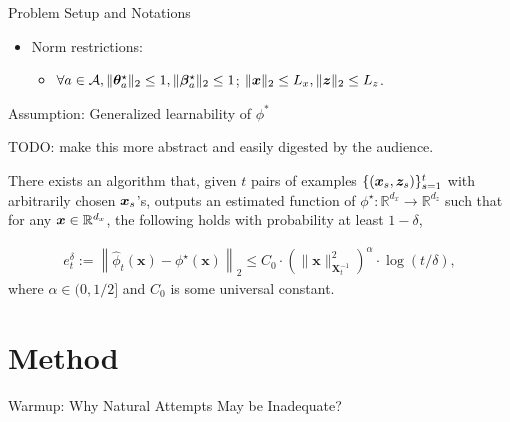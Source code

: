 \documentclass[10pt, xcolor=x11names,compress]{beamer}
\begin{document}
\begin{frame}[label=Background]{Problem Setup and Notations}
\begin{itemize}
\begin{itemize}
        \item Norm restrictions: 
        \begin{itemize}
            \item $\forall a \in {\mathcal{A}}, \|{\bm{\theta}}_a^\star\|_2\leq 1, \|{\bm{\beta}}_{a}^\star\|_2\leq 1 $; $\|{\bm{x}}\|_2\leq L_x, \|{\bm{z}}\|_2 \leq L_z$.
        \end{itemize}
        
    \end{itemize}
\end{itemize}

\end{frame}



\begin{frame}{Assumption: Generalized learnability of $\phi^*$}

TODO: make this more abstract and easily digested by the audience.

There exists an algorithm that, given $t$ pairs of examples $\{({\bm{x}}_s, {\bm{z}}_s)\}_{s=1}^t$ with  arbitrarily chosen ${\bm{x}}_s$'s,   outputs an estimated function of $\phi^\star: \mathbb{R}^{d_x} \rightarrow \mathbb{R}^{d_z}$ such that for any ${\bm{x}}\in \mathbb{R}^{d_x}$,  the following holds with probability at least $1-\delta$, 

\begin{align}
     e_t^\delta:=\left\|\widehat{\phi}_t(\boldsymbol{x})-\phi^{\star}(\boldsymbol{x})\right\|_2 \leq C_0 \cdot\left(\|\boldsymbol{x}\|_{\boldsymbol{X}_t^{-1}}^2\right)^\alpha \cdot \log (t / \delta), \nonumber
\end{align}
where $\alpha \in (0, 1/2]$ and $C_0$ is some universal constant. 

\end{frame}


\section{Method}

\begin{frame}[label=warmup]{Warmup: Why Natural Attempts May be Inadequate?}

\end{frame}
\end{document}
